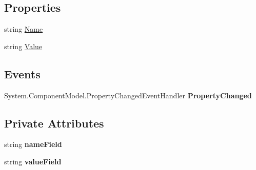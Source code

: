 \subsection*{Properties}
\begin{DoxyCompactItemize}
\item 
\hypertarget{class_price___comparison_1_1amazon_1_1ecs_1_1_property_a3f6859d1c6fc708376c2840d272cc578}{string \hyperlink{class_price___comparison_1_1amazon_1_1ecs_1_1_property_a3f6859d1c6fc708376c2840d272cc578}{Name}}\label{class_price___comparison_1_1amazon_1_1ecs_1_1_property_a3f6859d1c6fc708376c2840d272cc578}

\begin{DoxyCompactList}\small\item\em \end{DoxyCompactList}\item 
\hypertarget{class_price___comparison_1_1amazon_1_1ecs_1_1_property_ac63322d3cce42a682ec4f3472a3746b0}{string \hyperlink{class_price___comparison_1_1amazon_1_1ecs_1_1_property_ac63322d3cce42a682ec4f3472a3746b0}{Value}}\label{class_price___comparison_1_1amazon_1_1ecs_1_1_property_ac63322d3cce42a682ec4f3472a3746b0}

\begin{DoxyCompactList}\small\item\em \end{DoxyCompactList}\end{DoxyCompactItemize}
\subsection*{Events}
\begin{DoxyCompactItemize}
\item 
\hypertarget{class_price___comparison_1_1amazon_1_1ecs_1_1_property_a2beb2e1558be27edbd76098b3f0a1ca9}{System.\-Component\-Model.\-Property\-Changed\-Event\-Handler {\bfseries Property\-Changed}}\label{class_price___comparison_1_1amazon_1_1ecs_1_1_property_a2beb2e1558be27edbd76098b3f0a1ca9}

\end{DoxyCompactItemize}
\subsection*{Private Attributes}
\begin{DoxyCompactItemize}
\item 
\hypertarget{class_price___comparison_1_1amazon_1_1ecs_1_1_property_ac2cfe9c55925ddd1b54afa25650d497c}{string {\bfseries name\-Field}}\label{class_price___comparison_1_1amazon_1_1ecs_1_1_property_ac2cfe9c55925ddd1b54afa25650d497c}

\item 
\hypertarget{class_price___comparison_1_1amazon_1_1ecs_1_1_property_ab9d4b8d87f6e4d7ebf6701b2fbceabbf}{string {\bfseries value\-Field}}\label{class_price___comparison_1_1amazon_1_1ecs_1_1_property_ab9d4b8d87f6e4d7ebf6701b2fbceabbf}

\end{DoxyCompactItemize}


